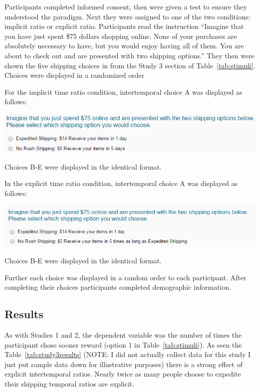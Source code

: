 \documentclass[]{article}
\begin{document}
Participants completed informed consent, then were given a test to ensure they understood the paradigm.
Next they were assigned to one of the two conditions: implicit ratio or explicit ratio. 
Participants read the instruction
``Imagine that you have just spent \$75 dollars shopping online. None of your purchases are absolutely necessary to have, but you would enjoy having all of them. You are about to check out and are presented with two shipping options.''
They then were shown the five shipping choices in from the Study 3 section of  Table~\ref{tab:stimuli}. 
Choices were displayed in a randomized order


For the implicit time ratio condition, intertemporal choice A was displayed as follows: 

\includegraphics[]{study3_implicit}

Choices B-E were displayed in the identical format. 

In the explicit time ratio condition, intertemporal choice A was displayed as follows:

\includegraphics[]{study3_explicit}

Choices B-E were displayed in the identical format. 

Further each choice was displayed in a random order to each participant. 
After completing their choices participants completed demographic information.


\subsection{Results}

As with Studies 1 and 2, the dependent variable was the number of times the participant chose sooner reward (option 1 in Table~\ref{tab:stimuli}). 
As seen the Table~\ref{tab:study3results} (NOTE: I did not actually collect data for this study I just put sample data down for illustrative purposes) there is a strong effect of explicit intertemporal ratios. 
Nearly twice as many people choose to expedite their shipping temporal ratios are explicit.
\end{document}
